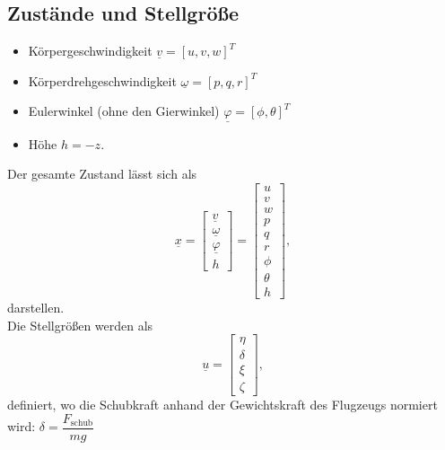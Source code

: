 \documentclass[10pt,a4paper]{article}
\begin{document}
\subsection{Zustände und Stellgröße}
\begin{itemize}
\item Körpergeschwindigkeit $\underline{v} = [u, v, w]^T$
\item Körperdrehgeschwindigkeit $\underline{\omega} = [p, q, r]^T$
\item Eulerwinkel (ohne den Gierwinkel) $\underline{\varphi} = [\phi, \theta]^T$
\item Höhe $h = -z$.

\end{itemize}
Der gesamte Zustand lässt sich als 
\begin{equation}
\underline{x} = \begin{bmatrix} 
\underline{v} \\
\underline{\omega} \\
\underline{\varphi}\\
h
\end{bmatrix} = \begin{bmatrix} 
u\\v\\w\\p\\q\\r\\ \phi\\ \theta\\ h
\end{bmatrix},
\end{equation}
darstellen.\\
Die Stellgrößen werden als 
\begin{equation}
\underline{u} = \begin{bmatrix} 
\eta \\ \delta \\ \xi \\ \zeta
\end{bmatrix},
\end{equation} 
definiert, wo die Schubkraft anhand der Gewichtskraft des Flugzeugs normiert wird: $\delta = \dfrac{F_\mathrm{schub}}{mg}$
\end{document}
